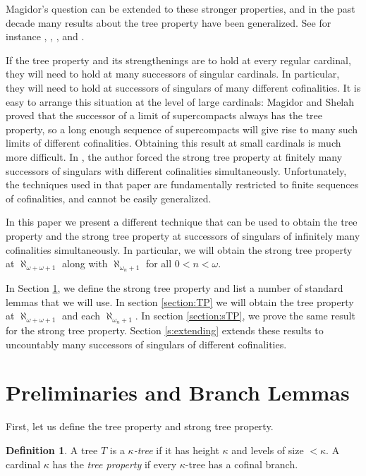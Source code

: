 \documentclass[psamsfonts]{amsart}
\theoremstyle{definition}
\newtheorem{defn}[thm]{Definition}
\newcommand{\ka}{\kappa}
\newcommand{\w}{\omega}
\numberwithin{equation}{section}
\begin{document}
Magidor's question can be extended to these stronger properties, and in the past decade many results about the tree property have been generalized. See for instance \cite{fontanella:CF}, \cite{UngerCF}, \cite{HachtmanITPNw+1}, and \cite{adkisson:ITP}.

If the tree property and its strengthenings are to hold at every regular cardinal, they will need to hold at many successors of singular cardinals. In particular, they will need to hold at successors of singulars of many different cofinalities. It is easy to arrange this situation at the level of large cardinals: Magidor and Shelah \cite{MS_TPSuccSing} proved that the successor of a limit of supercompacts always has the tree property, so a long enough sequence of supercompacts will give rise to many such limits of different cofinalities.
Obtaining this result at small cardinals is much more difficult. In \cite{adkisson:ITP}, the author forced the strong tree property at finitely many successors of singulars with different cofinalities simultaneously. %
Unfortunately, the techniques used in that paper are fundamentally restricted to finite sequences of cofinalities, and cannot be easily generalized.

In this paper we present a different technique that can be used to obtain the tree property and the strong tree property at successors of singulars of infinitely many cofinalities simultaneously. In particular, we will obtain the strong tree property at $\aleph_{\w+\w+1}$ along with $\aleph_{\w_n+1}$ for all $0< n < \w$.

In Section \ref{section:lemmas}, we define the strong tree property and list a number of standard lemmas that we will use. In section \ref{section:TP} we will obtain the tree property at $\aleph_{\w+\w+1}$ and each $\aleph_{\w_n+1}$. In section \ref{section:sTP}, we prove the same result for the strong tree property. Section \ref{s:extending} extends these results to uncountably many successors of singulars of different cofinalities.


\section{Preliminaries and Branch Lemmas}\label{section:lemmas}

First, let us define the tree property and strong tree property.%

\begin{defn}
	A tree $T$ is a \emph{$\ka$-tree} if it has height $\ka$ and levels of size $<\ka$. A cardinal $\ka$ has the \emph{tree property} if every $\ka$-tree has a cofinal branch.
\end{defn}
\end{document}
